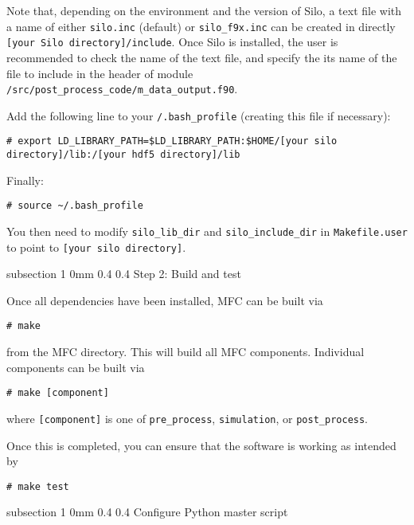 \documentclass[11pt]{article}
\makeatletter
\newcommand{\textapprox}{\raisebox{0.5ex}{\texttildelow}}
\renewcommand{\subsection}{\@startsection
{subsection}%
{1}%
{0mm}%
{0.4\baselineskip}%
{0.4\baselineskip}%
{\normalfont\large\bfseries\color{myBrown}}}%
\makeatother
\begin{document}
Note that, depending on the environment and the version of Silo, a text file with a name of either \texttt{silo.inc} (default) or \texttt{silo_f9x.inc} can be created in directly \texttt{[your Silo directory]/include}.
Once Silo is installed, the user is recommended to check the name of the text file, and specify the its name of the file to include in the header of module \texttt{/src/post_process_code/m_data_output.f90}.

Add the following line to your \texttt{\textapprox/.bash_profile} (creating this file if necessary):
\begin{lstlisting}[style=BashInputStyle]
	# export LD_LIBRARY_PATH=$LD_LIBRARY_PATH:$HOME/[your silo directory]/lib:/[your hdf5 directory]/lib
\end{lstlisting}

Finally:
\begin{lstlisting}[style=BashInputStyle]
	# source ~/.bash_profile
\end{lstlisting}

You then need to modify \texttt{silo\_lib\_dir} and \texttt{silo\_include\_dir} in \texttt{Makefile.user} to point to \texttt{[your silo directory]}.

\subsection{Step 2: Build and test}

Once all dependencies have been installed, MFC can be built via
\begin{lstlisting}[style=BashInputStyle]
	# make
\end{lstlisting}
from the MFC directory. 
This will build all MFC components. 
Individual components can be built via
\begin{lstlisting}[style=BashInputStyle]
	# make [component]
\end{lstlisting}
where \texttt{[component]} is one of \texttt{pre\_process}, 
\texttt{simulation}, or \texttt{post\_process}.

Once this is completed, you can ensure that the software is working as intended by
\begin{lstlisting}[style=BashInputStyle]
	# make test
\end{lstlisting}

\subsection{Configure Python master script}
\end{document}
